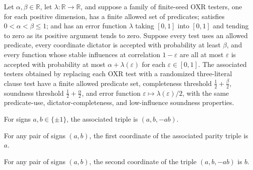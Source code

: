 \begin{theorem}
\label{FABL.oxrDictatorTest_to_e3Sat_affine}
\leanok
{}
Let $\alpha,\beta\in\mathbb R$, let $\lambda:\mathbb R\to\mathbb R$, and suppose a
family of finite-seed OXR testers, one for each positive dimension, has a finite allowed
set of predicates; satisfies $0<\alpha<\beta\le1$; and has an error function $\lambda$
taking $[0,1]$ into $[0,1]$ and tending to zero as its positive argument tends to zero.
Suppose every test uses an allowed predicate, every coordinate dictator is accepted with
probability at least $\beta$, and every function whose stable influences at correlation
$1-\varepsilon$ are all at most $\varepsilon$ is accepted with probability at most
$\alpha+\lambda(\varepsilon)$ for each $\varepsilon\in[0,1]$. The associated testers
obtained by replacing each OXR test with a randomized three-literal clause test have a
finite allowed predicate set, completeness threshold $\frac12+\frac\beta2$, soundness
threshold $\frac12+\frac\alpha2$, and error function
$\varepsilon\mapsto\lambda(\varepsilon)/2$, with the same predicate-use,
dictator-completeness, and low-influence soundness properties.
\end{theorem}

\begin{definition}
\label{FABL.oxrParityTriple}
\leanok
{}
For signs $a,b\in\{\pm1\}$, the associated triple is $(a,b,-ab)$.
\end{definition}

\begin{theorem}
\label{FABL.oxrParityTriple_zero}
\leanok
{}
For any pair of signs $(a,b)$, the first coordinate of the associated parity triple is
$a$.
\end{theorem}

\begin{theorem}
\label{FABL.oxrParityTriple_one}
\leanok
{}
For any pair of signs $(a,b)$, the second coordinate of the triple $(a,b,-ab)$ is $b$.
\end{theorem}

